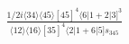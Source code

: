 \documentclass[varwidth, border=5pt]{standalone}
\begin{document}
\begin{my}
$\begin{gathered}
\scriptscriptstyle\frac{1/2i\langle34\rangle\langle45\rangle[45]^4\langle6|1+2|3]^3}{\langle12\rangle\langle16\rangle[35]^4\langle2|1+6|5]s_{345}}
\end{gathered}$
\end{my}
\end{document}

